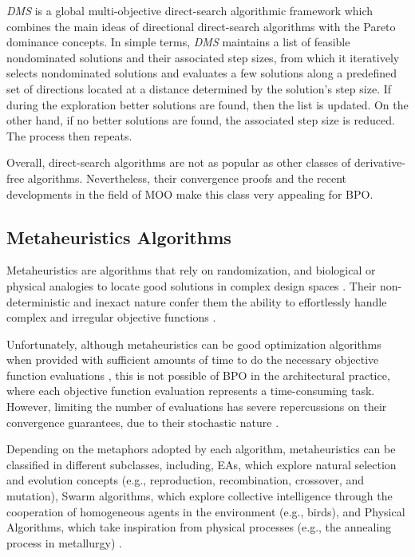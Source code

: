 \textit{\ac{DMS}} \cite{Custodio2010} is a global multi-objective direct-search algorithmic framework which combines the main ideas of directional direct-search algorithms with the Pareto dominance concepts. In simple terms, \textit{\ac{DMS}} maintains a list of feasible nondominated solutions and their associated step sizes, from which it iteratively selects nondominated solutions and evaluates a few solutions along a predefined set of directions located at a distance determined by the solution's step size. If during the exploration better solutions are found, then the list is updated. On the other hand, if no better solutions are found, the associated step size is reduced. The process then repeats. 

Overall, direct-search algorithms are not as popular as other classes of derivative-free algorithms. Nevertheless, their convergence proofs and the recent developments in the field of \ac{MOO} make this class very appealing for \ac{BPO}. 

\subsection{Metaheuristics Algorithms}
Metaheuristics are algorithms that rely on randomization, and biological or physical analogies to locate good solutions in complex design spaces \cite{Glover2003Metaheuristics}. Their non-deterministic and inexact nature confer them the ability to effortlessly handle complex and irregular objective functions \cite{Wortmann2017GABESTCHOICE}.

Unfortunately, although metaheuristics can be good optimization algorithms when provided with sufficient amounts of time to do the necessary objective function evaluations \cite{Conn2009}, this is not possible of \ac{BPO} in the architectural practice, where each objective function evaluation represents a time-consuming task. However, limiting the number of evaluations has severe repercussions on their convergence guarantees, due to their stochastic nature \cite{Hasancebi2009}.

Depending on the metaphors adopted by each algorithm, metaheuristics can be classified in different subclasses, including, \acp{EA}, which explore natural selection and evolution concepts (e.g., reproduction, recombination, crossover, and mutation), Swarm algorithms, which explore collective intelligence through the cooperation of homogeneous agents in the environment (e.g., birds), and Physical Algorithms, which take inspiration from physical processes (e.g., the annealing process in metallurgy) \cite{Glover2003Metaheuristics}.


